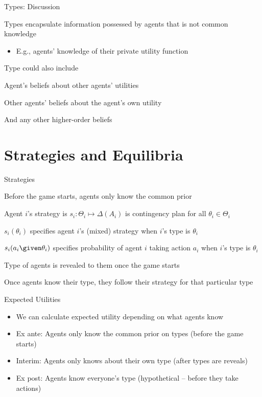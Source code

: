 \documentclass[11pt,aspectratio=169,handout]{beamer}
\begin{document}
  
  \begin{frame}{Types: Discussion}
   \begin{itemizes}
    \item Types encapsulate information possessed by agents that is \alert{not} common knowledge
    \begin{itemize}
     \item E.g., agents' knowledge of their private utility function
    \end{itemize}
    \item Type could also include
    \begin{itemizes}[0.7em]
     \item Agent's beliefs about other agents' utilities
     \item Other agents' beliefs about the agent's own utility
     \item And any other higher-order beliefs
    \end{itemizes}
   \end{itemizes}
  \end{frame}
  
 \section{Strategies and Equilibria}

  \begin{frame}{Strategies}
   \begin{itemizes}[1.2em]
    \item \alert{Before} the game starts, agents only know the common prior
    \item Agent $i$'s strategy is $s_i: \Theta_i \mapsto \Delta(A_i)$ is \alert{contingency plan} for all $\theta_i \in \Theta_i$
    \item $s_i(\theta_i)$ specifies agent $i$'s (mixed) strategy when $i$'s type is $\theta_i$
    \item $s_i(a_i \given \theta_i)$ specifies probability of agent $i$ taking action $a_i$ when $i$'s type is $\theta_i$
    \item Type of agents is \alert{revealed} to them once the game \alert{starts}
    \item Once agents know their type, they follow their strategy for that particular type
   \end{itemizes}
  \end{frame}
  
  
  \begin{frame}{Expected Utilities}
   \begin{itemize}[<+->]
   \setlength{\itemsep}{1.5em}
    \item We can calculate expected utility depending on what agents know
    \item \alert{Ex ante}: Agents only know the common prior on types (before the game starts)
    \item \alert{Interim}: Agents only knows about their own type (after types are reveals)
    \item \alert{Ex post}: Agents know everyone's type (hypothetical -- before they take actions)
   \end{itemize}
  \end{frame}
\end{document}
